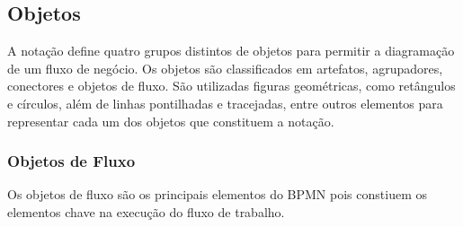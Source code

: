 \subsection{Objetos}\label{sec:activiti-bpmn_objetos}

A notação define quatro grupos distintos de objetos para permitir a diagramação de um fluxo de negócio. Os objetos são classificados em artefatos, agrupadores, conectores e objetos de fluxo. São utilizadas figuras geométricas, como retângulos e círculos, além de linhas pontilhadas e tracejadas, entre outros elementos para representar cada um dos objetos que constituem a notação.

\subsubsection{Objetos de Fluxo}\label{sec:activiti-bpmn_objetos_fluxo}

Os objetos de fluxo são os principais elementos do BPMN pois constiuem os elementos chave na execução do fluxo de trabalho.


